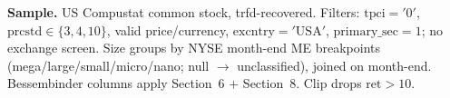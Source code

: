 \documentclass[10pt]{article}
\begin{document}
\vfill
\noindent\scriptsize
\textbf{Sample.} US Compustat common stock, trfd-recovered. Filters: $\mathrm{tpci}='0'$,
$\mathrm{prcstd}\in\{3,4,10\}$, valid price/currency, $\mathrm{excntry}='\mathrm{USA}'$,
$\mathrm{primary\_sec}=1$; no exchange screen. Size groups by NYSE month-end ME breakpoints
(mega/large/small/micro/nano; null $\to$ unclassified), joined on month-end.
Bessembinder columns apply Section~6 $+$ Section~8. Clip drops $\mathrm{ret}>10$.
\end{document}
